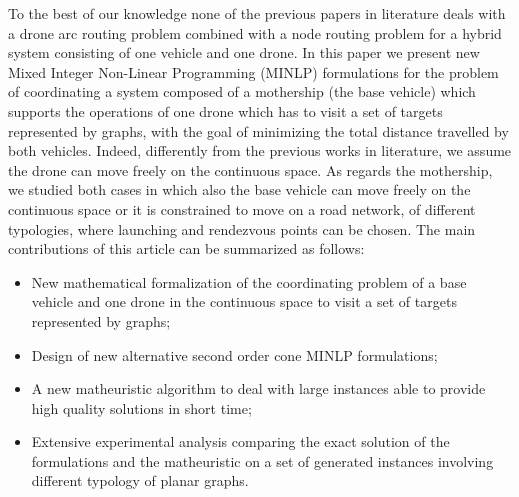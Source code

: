 To the best of our knowledge none of the previous papers in literature deals with a drone arc routing problem combined with a node routing problem for a hybrid system consisting of one vehicle and one drone.
In this paper we present new Mixed Integer Non-Linear Programming (MINLP) formulations for the problem of coordinating a system composed of a mothership (the base vehicle) which supports the operations of one drone which has to visit a set of targets represented by graphs, with the goal of minimizing the total distance travelled by both vehicles.
Indeed, differently from the previous works in literature, we assume the drone can move freely on the continuous space. As regards the mothership, we studied both cases in which also the base vehicle can move freely on the continuous space or it is constrained to move on a road network, of different typologies, where launching and rendezvous points can be chosen.
The main contributions of this article can be summarized as follows:
\begin{itemize}
    \item New mathematical formalization of the coordinating problem of a base vehicle and one drone in the continuous space to visit a set of targets represented by graphs;
    \item Design of new alternative second order cone MINLP formulations;
    \item A new matheuristic algorithm to deal with large instances able to provide high quality solutions in short time;
    \item Extensive experimental analysis comparing the exact solution of the formulations and the matheuristic on a set of generated instances involving different typology of planar graphs.
\end{itemize}
 

